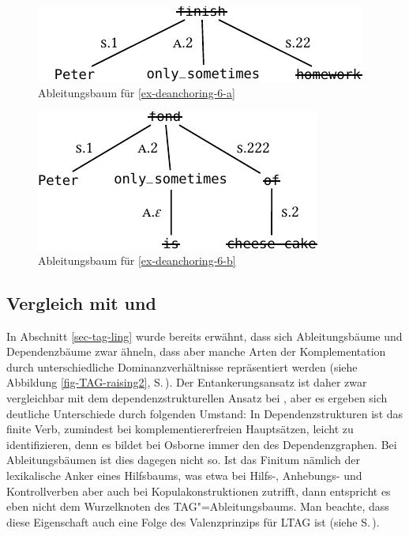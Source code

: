 \begin{figure}[t]
\centering
\includegraphics{graphics/abb819.pdf}
\caption{\label{fig-deanchoring-6}Ableitungsbaum für \ref{ex-deanchoring-6-a} \citep[Abbildung~8]{Lichte:Kallmeyer:10}}
\end{figure}

\begin{figure}[t]
\centering
\includegraphics{graphics/abb820.pdf}
\caption{\label{fig-deanchoring-7}Ableitungsbaum für \ref{ex-deanchoring-6-b} \citep[Abbildung~9]{Lichte:Kallmeyer:10}}
\end{figure}

\subsection{Vergleich mit \cite{Osborne:08} und \cite{Kobele:09}}

In Abschnitt \ref{sec-tag-ling} wurde bereits erwähnt, dass sich Ableitungsbäume und Dependenzbäume zwar ähneln, dass aber manche Arten der Komplementation durch unterschiedliche Dominanzverhältnisse repräsentiert werden (siehe Abbildung \ref{fig-TAG-raising2}, S.\,\pageref{fig-TAG-raising2}). Der Ent\-ankerungs\-ansatz ist daher zwar vergleichbar mit dem dependenzstrukturellen Ansatz bei \cite{Osborne:08}, aber es ergeben sich deutliche Unterschiede durch folgenden Umstand: In Dependenzstrukturen ist das finite Verb, zumindest bei komplementiererfreien Hauptsätzen, leicht zu identifizieren, denn es bildet bei Osborne immer den  des Dependenzgraphen. Bei Ableitungsbäumen ist dies dagegen nicht so. Ist das Finitum nämlich der lexikalische Anker eines Hilfsbaums, was etwa bei Hilfs-, Anhebungs- und Kontrollverben aber auch bei Kopulakonstruktionen zutrifft, dann entspricht es eben nicht dem Wurzelknoten des TAG"=Ableitungsbaums. Man beachte, dass diese Eigenschaft auch eine Folge des Valenzprinzips für LTAG ist (siehe S.\,\pageref{ex-valenzprinzip-tag}).  

